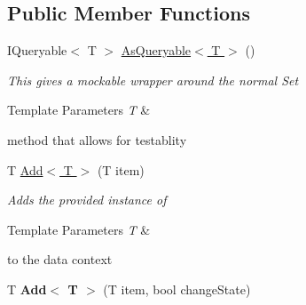 \subsection*{Public Member Functions}
\begin{DoxyCompactItemize}
\item 
I\-Queryable$<$ T $>$ \hyperlink{class_highway_1_1_data_1_1_entity_framework_1_1_tests_1_1_unit_tests_1_1_e_f_failure_context_a40bdc0e9e6f79d8e821c4790dce61150}{As\-Queryable$<$ T $>$} ()
\begin{DoxyCompactList}\small\item\em This gives a mockable wrapper around the normal Set
\begin{DoxyTemplParams}{Template Parameters}
{\em T} & \\
\hline
\end{DoxyTemplParams}
method that allows for testablity \end{DoxyCompactList}\item 
T \hyperlink{class_highway_1_1_data_1_1_entity_framework_1_1_tests_1_1_unit_tests_1_1_e_f_failure_context_adacf246f8528bd4438c5ef5b2eed1467}{Add$<$ T $>$} (T item)
\begin{DoxyCompactList}\small\item\em Adds the provided instance of 
\begin{DoxyTemplParams}{Template Parameters}
{\em T} & \\
\hline
\end{DoxyTemplParams}
to the data context \end{DoxyCompactList}\item 
\hypertarget{class_highway_1_1_data_1_1_entity_framework_1_1_tests_1_1_unit_tests_1_1_e_f_failure_context_a080e373f50a82ebc47feca366db029b1}{T {\bfseries Add$<$ T $>$} (T item, bool change\-State)}\label{class_highway_1_1_data_1_1_entity_framework_1_1_tests_1_1_unit_tests_1_1_e_f_failure_context_a080e373f50a82ebc47feca366db029b1}


\end{DoxyCompactItemize}
